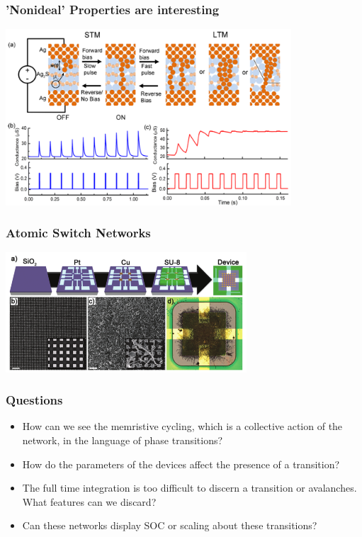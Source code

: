 \documentclass[mathserif]{beamer}
\begin{document}
\begin{frame}
\frametitle{'Nonideal' Properties are interesting}

\begin{center}
\includegraphics[width=0.8\textwidth]{STM_LTP.png}
\end{center}

\end{frame}

\begin{frame}
\frametitle{Atomic Switch Networks}

\begin{center}
\includegraphics[width=9cm]{ASN_fabrication.png}
\end{center}

\end{frame}

\begin{frame}
\frametitle{Questions}
\begin{itemize}
\item How can we see the memristive cycling, which is a collective action of the network,
in the language of phase transitions?
\item How do the parameters of the devices affect the presence of a transition?
\item The full time integration is too difficult to discern a transition or avalanches.
What features can we discard?
\item Can these networks display SOC or scaling about these transitions?
\end{itemize}
\end{frame}
\end{document}
